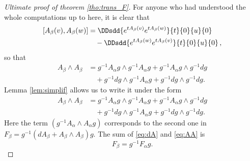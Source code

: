 \begin{proof}[Ultimate proof of theorem \ref{tho:trans_F}]
For anyone who had understood the whole computations up to here, it is clear that
\begin{equation}
\begin{split}
     [A_{\beta}(v),A_{\beta}(w)]&=\DDsdd{ e^{tA_{\beta}(v)}e^{tA_{\beta}(w)} }{t}{0}{u}{0}\\
                            &\quad-\DDsdd{ e^{tA_{\beta}(w)}e^{tA_{\beta}(v)} }{t}{0}{u}{0}\,,
\end{split}
\end{equation}
so that
\begin{equation}
\begin{split}
  A_{\beta}\wedge A_{\beta}&=g^{-1} A_{\alpha} g\wedge g^{-1} A_{\alpha} g
                         +g^{-1} A_{\alpha} g\wedge g^{-1} dg\\
		       &\quad+g^{-1} dg\wedge g^{-1} A_{\alpha} g
		       +g^{-1} dg\wedge g^{-1} dg.
\end{split}
\end{equation}
Lemma \ref{lem:simplif} allows us to write it under the form
\begin{equation}\label{eq:AA}
\begin{split}
  A_{\beta}\wedge A_{\beta}&=g^{-1} A_{\alpha} g\wedge g^{-1} A_{\alpha} g
                         +g^{-1} A_{\alpha} g\wedge g^{-1} dg\\
		       &\quad+g^{-1} dg\wedge g^{-1} A_{\alpha} g
		       +g^{-1} dg\wedge g^{-1} dg.
\end{split}
\end{equation}
Here the term $(g^{-1} A_{\alpha}\wedge A_{\alpha} g)$ corresponds to the second one in $F_{\beta}=g^{-1}(dA_{\beta}+A_{\beta}\wedge A_{\beta})g$. The sum of \eqref{eq:dA} and \eqref{eq:AA} is
\[
    F_{\beta}=g^{-1} F_{\alpha} g.
\]
\end{proof}




